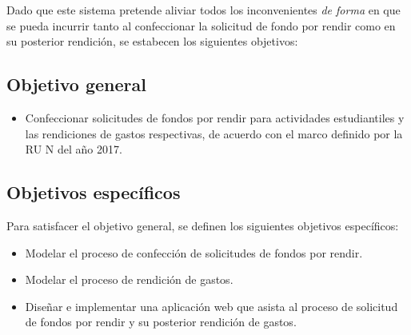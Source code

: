 Dado que este sistema pretende aliviar todos los inconvenientes \emph{de forma} en que se pueda incurrir tanto al confeccionar la solicitud de fondo por rendir como en su posterior rendición, se estabecen los siguientes objetivos:

\subsection{Objetivo general}
    \begin{itemize}
        \item Confeccionar solicitudes de fondos por rendir para actividades estudiantiles y las rendiciones de gastos respectivas, de acuerdo con el marco definido por la RU N del año 2017.
    \end{itemize}

\subsection{Objetivos específicos} 

Para satisfacer el objetivo general, se definen los siguientes objetivos específicos:

    \begin{itemize}
        \item Modelar el proceso de confección de solicitudes de fondos por rendir.

        \item Modelar el proceso de rendición de gastos.

        \item Diseñar e implementar una aplicación web que asista al proceso de solicitud de fondos por rendir y su posterior rendición de gastos.

    \end{itemize}
